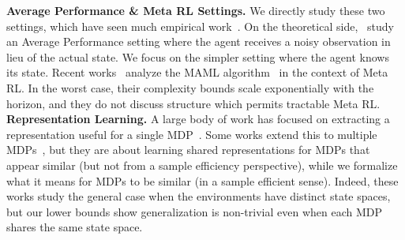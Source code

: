 \documentclass[11pt,twoside]{article}
\begin{document}
\noindent \textbf{Average Performance \& Meta RL Settings.} We directly study these two settings, which have seen much empirical work~\citep{packer18, cobbe19, cobbe19procgen, rakelly19, yu19}. On the theoretical side,~\citep{bertran20, song20} study an Average Performance setting where the agent receives a noisy observation in lieu of the actual state. We focus on the simpler setting where the agent knows its state. Recent works~\citep{fallah20, wang20meta} analyze the MAML algorithm~\citep{finn17} in the context of Meta RL. In the worst case, their complexity bounds scale exponentially with the horizon, and they do not discuss structure which permits tractable Meta RL. \\

\noindent \textbf{Representation Learning.} A large body of work has focused on extracting a representation useful for a single MDP~\citep{ferns04, castro20similar, lan21, zhang21bisim}. Some works extend this to multiple MDPs~\citep{castro10transfer, agarwal21contrastive, sonar20}, but they are about learning shared representations for MDPs that appear similar (but not from a sample efficiency perspective), while we formalize what it means for MDPs to be similar (in a sample efficient sense). Indeed, these works study the general case when the environments have distinct state spaces, but our lower bounds show generalization is non-trivial even when each MDP shares the same state space.
\end{document}
